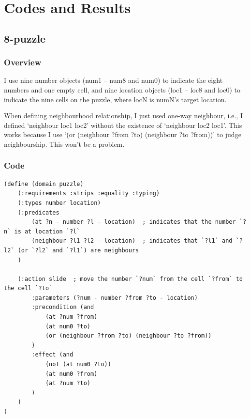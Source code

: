 ﻿\documentclass[a4paper, 11pt]{article}
\begin{document}
\section{Codes and Results}

\subsection{8-puzzle}
\subsubsection{Overview}
I use nine number objects (num1 -- num8 and num0) to indicate the eight numbers and one empty cell, and nine location objects (loc1 -- loc8 and loc0) to indicate the nine cells on the puzzle, where locN is numN's target location.

When defining neighbourhood relationship, I just used one-way neighbour, i.e., I defined `neighbour loc1 loc2' without the existence of `neighbour loc2 loc1'. This works because I use `(or (neighbour ?from ?to) (neighbour ?to ?from))' to judge neighbourship. This won't be a problem.

\subsubsection{Code}
\begin{lstlisting}[title=domain\_puzzle.pddl]
(define (domain puzzle)
    (:requirements :strips :equality :typing)
    (:types number location)
    (:predicates
        (at ?n - number ?l - location)  ; indicates that the number `?n` is at location `?l`
        (neighbour ?l1 ?l2 - location)  ; indicates that `?l1` and `?l2` (or `?l2` and `?l1`) are neighbours
    )

    (:action slide  ; move the number `?num` from the cell `?from` to the cell `?to`
        :parameters (?num - number ?from ?to - location)
        :precondition (and
            (at ?num ?from)
            (at num0 ?to)
            (or (neighbour ?from ?to) (neighbour ?to ?from))
        )
        :effect (and
            (not (at num0 ?to))
            (at num0 ?from)
            (at ?num ?to)
        )
    )
)
\end{lstlisting}
\end{document}
